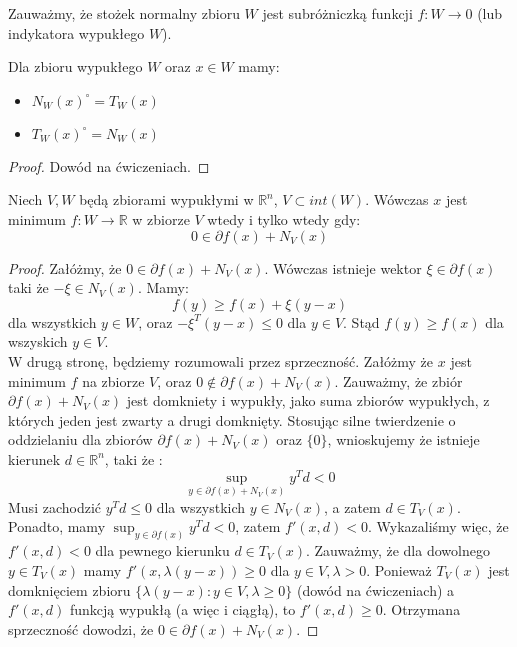 \documentclass[10pt,a4paper,draft]{report}
\begin{document}
\begin{remark}
Zauważmy, że stożek normalny zbioru $W$ jest subróżniczką funkcji $f:W \rightarrow 0$ (lub indykatora wypukłego $W$).
\end{remark}

\begin{theorem} \label{thm:normal_tangent_dual}
Dla zbioru wypukłego $W$ oraz $x \in W$ mamy:
\begin{itemize}
\item $N_W(x)^{\circ} = T_W(x)$
\item $T_W(x)^{\circ} = N_W(x)$
\end{itemize}
\end{theorem}
\begin{proof}
Dowód na ćwiczeniach.
\end{proof}

\begin{theorem}
Niech $V, W$ będą zbiorami wypukłymi w $\mathbb{R}^n$, $V \subset int(W)$. Wówczas $x$ jest minimum $f:W \rightarrow \mathbb{R}$ w zbiorze $V$ wtedy i tylko wtedy gdy:
\[
0 \in \partial f(x) + N_V(x)
\]
\end{theorem}
\begin{proof}
Załóżmy, że $0 \in \partial f(x) + N_V(x)$. Wówczas istnieje wektor $\xi \in \partial f(x)$ taki że $- \xi \in N_V(x)$. Mamy:
\[
f(y) \geq f(x) + \xi(y - x)
\]
dla wszystkich $y \in W$, oraz $-\xi^T(y - x) \leq 0$ dla $y \in V$. Stąd $f(y) \geq f(x)$ dla wszyskich $y \in V$.
\\

W drugą stronę, będziemy rozumowali przez sprzeczność. Załóżmy że $x$ jest minimum $f$ na zbiorze $V$, oraz $0 \not\in \partial f(x) + N_V(x)$.
Zauważmy, że zbiór $\partial f(x) + N_V(x)$ jest domkniety i wypukły, jako suma zbiorów wypukłych, z których jeden jest zwarty a drugi domknięty. Stosując silne twierdzenie o oddzielaniu dla zbiorów $\partial f(x) + N_V(x)$ oraz $\{ 0 \}$, wnioskujemy że istnieje kierunek $d \in \mathbb{R}^n$, taki że :
\[
\sup_{y \in \partial f(x) + N_V(x)} y^T d < 0
\]
Musi zachodzić $y^T d \leq 0$ dla wszystkich $y \in N_V(x)$, a zatem $d \in T_V(x)$. Ponadto, mamy $\sup_{y \in \partial f(x)} y^T d < 0$, zatem $f'(x,d) < 0$. Wykazaliśmy więc, że $f'(x,d) < 0$ dla pewnego kierunku $d \in T_V(x)$.
Zauważmy, że dla dowolnego $y \in T_V(x)$ mamy $f'(x,\lambda (y - x)) \geq 0$ dla $y \in V, \lambda > 0$. Ponieważ $T_V(x)$ jest domknięciem zbioru $\{\lambda(y - x) : y \in V, \lambda \geq 0\}$ (dowód na ćwiczeniach) a $f'(x,d)$ funkcją wypukłą (a więc i ciągłą), to $f'(x,d) \geq 0$. Otrzymana sprzeczność dowodzi, że $0 \in \partial f(x) + N_V(x)$.
\end{proof}
\end{document}

